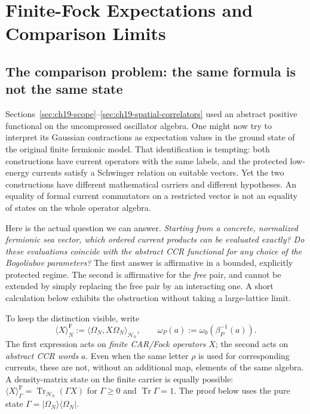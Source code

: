 \section{Finite-Fock Expectations and Comparison Limits}
\label{sec:ch19-finite-comparison}

\subsection{The comparison problem: the same formula is not the same state}

Sections~\ref{sec:ch19-scope}--\ref{sec:ch19-spatial-correlators}
used an abstract positive functional on the uncompressed oscillator algebra.
One might now try to interpret its Gaussian contractions as expectation values
in the ground state of the original finite fermionic model.  That identification
is tempting: both constructions have current operators with the same labels,
and the protected low-energy currents satisfy a Schwinger relation on suitable
vectors.  Yet the two constructions have different mathematical carriers and
different hypotheses.  An equality of formal current commutators on a
restricted vector is not an equality of states on the whole operator algebra.

Here is the actual question we can answer.  \emph{Starting from a concrete,
normalized fermionic sea vector, which ordered current products can be
evaluated exactly?  Do these evaluations coincide with the abstract CCR
functional for any choice of the Bogoliubov parameters?}  The first answer
is affirmative in a bounded, explicitly protected regime.  The second is
affirmative for the \emph{free} pair, and cannot be extended by simply
replacing the free pair by an interacting one.  A short calculation below
exhibits the obstruction without taking a large-lattice limit.

To keep the distinction visible, write
\begin{equation}
 \langle X\rangle^{\mathrm F}_{N}:=
 \langle\Omega_N,X\Omega_N\rangle_{\mathcal H_{h}},
 \qquad \omega_P(a):=\omega_0\!\left(\beta_P^{-1}(a)\right).
 \label{eq:ch19-comp-two-evaluators}
\end{equation}
The first expression acts on \emph{finite CAR/Fock operators} $X$;
the second acts on \emph{abstract CCR words} $a$.  Even when the same
letter $\rho$ is used for corresponding currents, these are not, without
an additional map, elements of the same algebra.  A density-matrix state
on the finite carrier is equally possible:
$\langle X\rangle^{\mathrm F}_{\Gamma}
=\operatorname{Tr}_{\mathcal H_h}(\Gamma X)$ for
$\Gamma\geq0$ and $\operatorname{Tr}\Gamma=1$.  The proof below uses the
pure state $\Gamma=|\Omega_N\rangle\langle\Omega_N|$.

